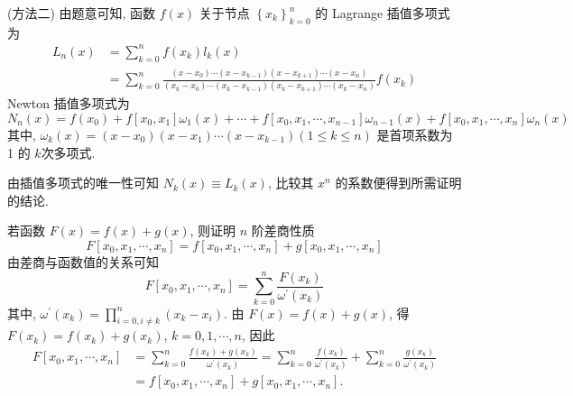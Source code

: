 \begin{tcolorbox}[enhanced,colback=10,colframe=9,breakable,coltitle=green!25!black,title=2024]
(方法二) 由题意可知, 函数 $ f(x) $ 关于节点 $ \left\{x_{k}\right\}_{k=0}^{n} $ 的 Lagrange 插值多项式为
$$
\begin{aligned}
L_{n}(x) & =\sum_{k=0}^{n} f\left(x_{k}\right) l_{k}(x) \\
& =\sum_{k=0}^{n} \frac{\left(x-x_{0}\right) \cdots\left(x-x_{k-1}\right)\left(x-x_{k+1}\right) \cdots\left(x-x_{n}\right)}{\left(x_{k}-x_{0}\right) \cdots\left(x_{k}-x_{k-1}\right)\left(x_{k}-x_{k+1}\right) \cdots\left(x_{k}-x_{n}\right)} f\left(x_{k}\right)
\end{aligned}
$$
Newton 插值多项式为
$$
N_{n}(x)=  f\left(x_{0}\right)+f\left[x_{0}, x_{1}\right] \omega_{1}(x)+\cdots+f\left[x_{0}, x_{1}, \cdots, x_{n-1}\right] \omega_{n-1}(x)  +f\left[x_{0}, x_{1}, \cdots, x_{n}\right] \omega_{n}(x)
$$
其中, $ \omega_{k}(x)=\left(x-x_{0}\right)\left(x-x_{1}\right) \cdots\left(x-x_{k-1}\right)(1 \leqslant k \leqslant n) $ 是首项系数为 1 的 $ k $次多项式.

由插值多项式的唯一性可知 $ N_{k}(x) \equiv L_{k}(x) $, 比较其 $ x^{n} $ 的系数便得到所需证明的结论.
\end{tcolorbox}

  \begin{tcolorbox}[enhanced,colback=10,colframe=9,breakable,coltitle=green!25!black,title=2024]
  若函数 $ F(x)=f(x)+g(x) $, 则证明 $ n $ 阶差商性质
$$
F\left[x_{0}, x_{1}, \cdots, x_{n}\right]=f\left[x_{0}, x_{1}, \cdots, x_{n}\right]+g\left[x_{0}, x_{1}, \cdots, x_{n}\right]
$$
\tcblower
 由差商与函数值的关系可知
$$
F\left[x_{0}, x_{1}, \cdots, x_{n}\right]=\sum_{k=0}^{n} \frac{F\left(x_{k}\right)}{\omega^{\prime}\left(x_{k}\right)}
$$
其中, $\displaystyle \omega^{\prime}\left(x_{k}\right)=\prod_{i=0, i \neq k}^{n}\left(x_{k}-x_{i}\right) $. 由 $ F(x)=f(x)+g(x) $, 得 $ F\left(x_{k}\right)=f\left(x_{k}\right)+g\left(x_{k}\right) $, $ k=0,1, \cdots, n $, 因此
$$
\begin{aligned}
F\left[x_{0}, x_{1}, \cdots, x_{n}\right] & =\sum_{k=0}^{n} \frac{f\left(x_{k}\right)+g\left(x_{k}\right)}{\omega^{\prime}\left(x_{k}\right)}=\sum_{k=0}^{n} \frac{f\left(x_{k}\right)}{\omega^{\prime}\left(x_{k}\right)}+\sum_{k=0}^{n} \frac{g\left(x_{k}\right)}{\omega^{\prime}\left(x_{k}\right)} \\
& =f\left[x_{0}, x_{1}, \cdots, x_{n}\right]+g\left[x_{0}, x_{1}, \cdots, x_{n}\right] .
\end{aligned}
$$
\end{tcolorbox}

